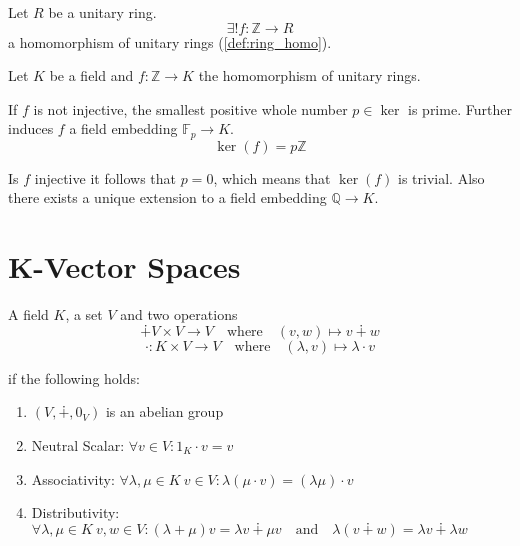 \begin{proposition}
   Let \(R\) be a unitary ring.
   \[\exists! f: \mathbb{Z} \to R\]
   a homomorphism of unitary rings (\ref{def:ring_homo}).
\end{proposition}

\begin{proposition}
   Let \(K\) be a field and \(f: \mathbb{Z} \to K\) the homomorphism of unitary rings.

   If \(f\) is not injective, the smallest positive whole number \(p \in \ker\) is prime.
   Further induces \(f\) a field embedding \(\mathbb{F}_p \to K\).
   \[\ker(f) = p\mathbb{Z}\]

   Is \(f\) injective it follows that \(p = 0\), which means that \(\ker(f)\) is trivial.
   Also there exists a unique extension to a field embedding \(\mathbb{Q} \to K\).
\end{proposition}


\section{K-Vector Spaces}
\begin{definition}\label{def:vector_spaces}
   A field \(K\), a set \(V\) and two operations
   \[\dotplus V \times V \to V \quad\text{where}\quad (v, w) \mapsto v \dotplus w\]
   \[\cdot: K \times V \to V \quad\text{where}\quad (\lambda, v) \mapsto \lambda \cdot v\]

   if the following holds:
   \begin{enumerate}[label=\roman*, align=Center]
      \item \((V, \dotplus, 0_V)\) is an abelian group
      \item Neutral Scalar: \(\forall v \in V: 1_K \cdot v = v\)
      \item Associativity: \(\forall \lambda, \mu \in K~v \in V: \lambda (\mu \cdot v) = (\lambda \mu) \cdot v\)
      \item Distributivity: \(\forall \lambda, \mu \in K~v, w \in V: (\lambda + \mu) v = \lambda v \dotplus \mu v \quad\text{and}\quad \lambda (v \dotplus w) = \lambda v \dotplus \lambda w\)
   \end{enumerate}
\end{definition}

